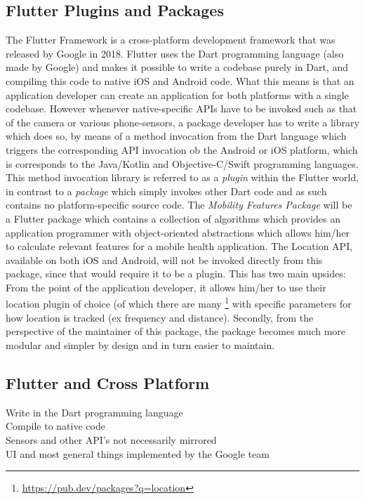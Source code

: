 \subsection{Flutter Plugins and Packages}
The Flutter Framework is a cross-platform development framework that was released by Google in 2018. Flutter uses the Dart programming language (also made by Google) and makes it possible to write a codebase purely in Dart, and compiling this code to native iOS and Android code. What this means is that an application developer can create an application for both platforms with a single codebase. However whenever native-specific APIs have to be invoked such as that of the camera or various phone-sensors, a package developer has to write a library which does so, by means of a method invocation from the Dart language which triggers the corresponding API invocation ob the Android or iOS platform, which is corresponds to the Java/Kotlin and Objective-C/Swift programming languages. This method invocation library is referred to as a \textit{plugin} within the Flutter world, in contrast to a \textit{package} which simply invokes other Dart code and as such contains no platform-specific source code. The \textit{Mobility Features Package} will be a Flutter package which contains a collection of algorithms which provides an application programmer with object-oriented abstractions which allows him/her to calculate relevant features for a mobile health application. The Location API, available on both iOS and Android, will not be invoked directly from this package, since that would require it to be a plugin. This has two main upsides: From the point of the application developer, it allows him/her to use their location plugin of choice (of which there are many \footnote{\url{https://pub.dev/packages?q=location}} with specific parameters for how location is tracked (ex frequency and distance). Secondly, from the perspective of the maintainer of this package, the package becomes much more modular and simpler by design and in turn easier to maintain.

\subsection{Flutter and Cross Platform}
Write in the Dart programming language\\
Compile to native code\\
Sensors and other API's not necessarily mirrored\\
UI and most general things implemented by the Google team\\
